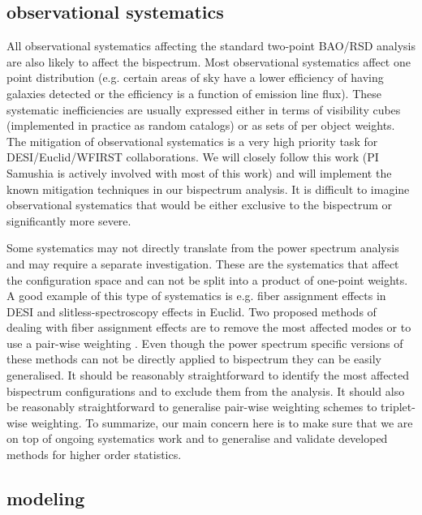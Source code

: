 \subsection*{observational systematics}

All observational systematics affecting the standard two-point BAO/RSD analysis
are also likely to affect the bispectrum. Most observational systematics affect
one point distribution (e.g. certain areas of sky have a lower efficiency of
having galaxies detected or the efficiency is a function of emission line
flux). These systematic inefficiencies are usually expressed either in terms of
visibility cubes (implemented in practice as random catalogs) or as sets of
per object weights. The mitigation of observational systematics is a very high
priority task for DESI/Euclid/WFIRST collaborations. We will closely follow
this work (PI Samushia is actively involved with most of this work) and will
implement the known mitigation techniques in our bispectrum analysis. It is
difficult to imagine observational systematics that would be either exclusive
to the bispectrum or significantly more severe.

Some systematics may not directly translate from the power spectrum analysis
and may require a separate investigation. These are the systematics that affect
the configuration space and can not be split into a product of one-point
weights. A good example of this type of systematics is e.g. fiber assignment
effects in DESI and slitless-spectroscopy effects in Euclid. Two
proposed methods of dealing with fiber assignment effects are to remove the
most affected modes or to use a pair-wise weighting \cite{2017JCAP...04..008P,2018MNRAS.481.2338B,2017JCAP...03..001B,2017MNRAS.472.1106B,2017MNRAS.472L..40P,2018arXiv181000323Y,2018arXiv180907355S}. Even though the power
spectrum specific versions of these methods can not be directly applied to
bispectrum they can be easily generalised. It should be reasonably
straightforward to identify the most affected bispectrum configurations and to
exclude them from the analysis. It should also be reasonably straightforward to
generalise pair-wise weighting schemes to triplet-wise weighting. To summarize,
our main concern here is to make sure that we are on top of ongoing systematics
work and to generalise and validate developed methods for higher order
statistics.

\subsection*{modeling}

